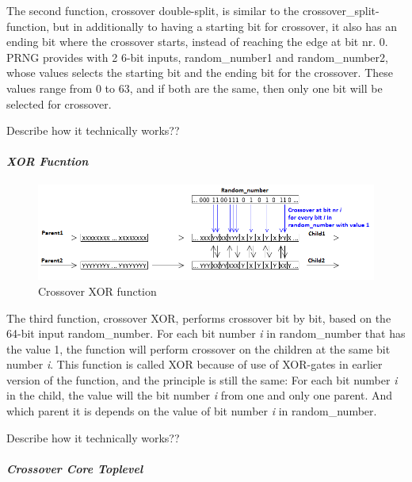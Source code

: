 The second function, crossover double-split, is similar to the crossover\_split-function, but in additionally to having a starting bit for crossover, it also has an ending bit where the crossover starts, instead of reaching the edge at bit nr. 0. PRNG provides with 2 6-bit inputs, random\_number1 and random\_number2, whose values selects the starting bit and the ending bit for the crossover. These values range from 0 to 63, and if both are the same, then only one bit will be selected for crossover.

\todo Describe how it technically works??

\paragraph{\textit{XOR Fucntion}}
\begin{figure}[H]
\includegraphics[width=\textwidth]{fpga/fig/crossover_xor.png}
\caption{Crossover XOR function}
\label{fig_crossover_xor}
\end{figure}

The third function, crossover XOR, performs crossover bit by bit, based on the 64-bit input random\_number. For each bit number \textit{i} in random\_number that has the value 1, the function will perform crossover on the children at the same bit number \textit{i}. This function is called XOR because of use of XOR-gates in earlier version of the function, and the principle is still the same: For each bit number \textit{i} in the child, the value will the bit number \textit{i} from one and only one parent. And which parent it is depends on the value of bit number \textit{i} in random\_number.

\todo Describe how it technically works??

\paragraph{\textit{Crossover Core Toplevel}}

